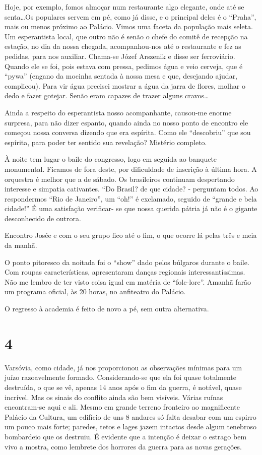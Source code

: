 Hoje, por exemplo, fomos almoçar num restaurante algo elegante, onde até se senta\ldots Os populares servem em pé, como já disse, e o principal deles é o “Praha”, mais ou menos próximo ao Palácio. Vimos uma faceta da população mais seleta. Um esperantista local, que outro não é senão o chefe do comitê de recepção na estação, no dia da nossa chegada, acompanhou-nos até o restaurante e fez as pedidas, para nos auxiliar. Chama-se Józef Arszenik e disse ser ferroviário. Quando ele se foi, pois estava com pressa, pedimos água e veio cerveja, que é “pywa” (engano da mocinha sentada à nossa mesa e que, desejando ajudar, complicou). Para vir água precisei mostrar a água da jarra de flores, molhar o dedo e fazer gotejar. Senão eram capazes de trazer alguns cravos\ldots

Ainda a respeito do esperantista nosso acompanhante, causou-me enorme surpresa, para não dizer espanto, quando ainda no nosso ponto de encontro ele começou nossa conversa dizendo que era espírita. Como ele “descobriu” que sou espírita, para poder ter sentido sua revelação? Mistério completo.

À noite tem lugar o baile do congresso, logo em seguida ao banquete monumental. Ficamos de fora deste, por dificuldade de inscrição à última hora. A orquestra é melhor que a de sábado. Os brasileiros continuam despertando interesse e simpatia cativantes. “Do Brasil? de que cidade? - perguntam todos. Ao respondermos “Rio de Janeiro”, um “oh!” é exclamado, seguido de “grande e bela cidade!” É uma satisfação verificar- se que nossa querida pátria já não é o gigante desconhecido de outrora.

Encontro Josée e com o seu grupo fico até o fim, o que ocorre lá pelas três e meia da manhã.

O ponto pitoresco da noitada foi o “show” dado pelos búlgaros durante o baile. Com roupas características, apresentaram danças regionais interessantíssimas. Não me lembro de ter visto coisa igual em matéria de “folc-lore”. Amanhã farão um programa oficial, às 20 horas, no anfiteatro do Palácio.

O regresso à academia é feito de novo a pé, sem outra alternativa.

\section*{4 \adfflatleafright {}}
Varsóvia, como cidade, já nos proporcionou as observações mínimas para um juízo razoavelmente formado. Considerando-se que ela foi quase totalmente destruída, o que se vê, apenas 14 anos após o fim da guerra, é notável, quase incrível. Mas os sinais do conflito ainda são bem visíveis. Várias ruínas encontram-se aqui e ali. Mesmo em grande terreno fronteiro ao magnificente Palácio da Cultura, um edifício de uns 8 andares só falta desabar com um espirro um pouco mais forte; paredes, tetos e lages jazem intactos desde algum tenebroso bombardeio que os destruiu. É evidente que a intenção é deixar o estrago bem vivo a mostra, como lembrete dos horrores da guerra para as novas gerações.

